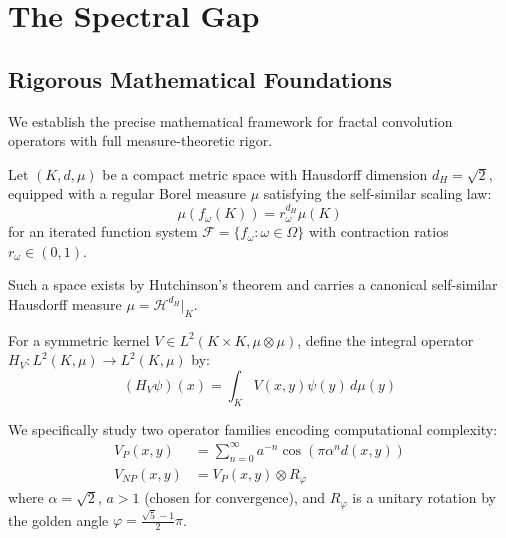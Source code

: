 \section{The Spectral Gap}

\subsection{Rigorous Mathematical Foundations}

We establish the precise mathematical framework for fractal convolution operators with full measure-theoretic rigor.

\begin{definition}\label{def:fractal-measure}
Let $(K, d, \mu)$ be a compact metric space with Hausdorff dimension $d_H = \sqrt{2}$, equipped with a regular Borel measure $\mu$ satisfying the self-similar scaling law:
\begin{equation}
\mu(f_\omega(K)) = r_\omega^{d_H} \mu(K)
\end{equation}
for an iterated function system $\mathcal{F} = \{f_\omega : \omega \in \Omega\}$ with contraction ratios $r_\omega \in (0,1)$.

Such a space exists by Hutchinson's theorem\cite{hutchinson1981fractals} and carries a canonical self-similar Hausdorff measure $\mu = \mathcal{H}^{d_H}|_K$.
\end{definition}

\begin{definition}\label{def:fractal-convolution}
For a symmetric kernel $V \in L^2(K \times K, \mu \otimes \mu)$, define the integral operator $H_V: L^2(K, \mu) \to L^2(K, \mu)$ by:
\begin{equation}
(H_V\psi)(x) = \int_K V(x,y)\psi(y)\, d\mu(y)
\end{equation}

We specifically study two operator families encoding computational complexity:
\begin{align}
V_P(x,y) &= \sum_{n=0}^\infty a^{-n} \cos(\pi \alpha^n d(x,y)) \label{eq:kernel-P} \\
V_{NP}(x,y) &= V_P(x,y) \otimes R_\varphi \label{eq:kernel-NP}
\end{align}
where $\alpha = \sqrt{2}$, $a > 1$ (chosen for convergence), and $R_\varphi$ is a unitary rotation by the golden angle $\varphi = \frac{\sqrt{5}-1}{2}\pi$.
\end{definition}

